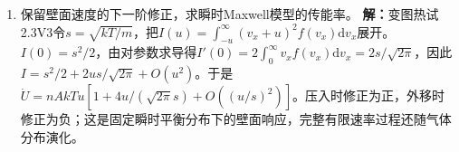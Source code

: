 \documentclass[UTF8,fontset=fandol,a4paper,11pt]{ctexart}
\begin{document}
\begin{enumerate}
\item 保留壁面速度的下一阶修正，求瞬时Maxwell模型的传能率。
\textbf{解：}变图热试2.3V3令$s=\sqrt{kT/m}$，把$I(u)=\int_{-u}^{\infty}(v_x+u)^2f(v_x)\mathrm dv_x$展开。$I(0)=s^2/2$，由对参数求导得$I'(0)=2\int_0^\infty v_xf(v_x)\mathrm dv_x=2s/\sqrt{2\pi}$，因此$I=s^2/2+2us/\sqrt{2\pi}+O(u^2)$。于是$\dot U=nAkTu[1+4u/(\sqrt{2\pi}s)+O((u/s)^2)]$。压入时修正为正，外移时修正为负；这是固定瞬时平衡分布下的壁面响应，完整有限速率过程还随气体分布演化。
\begin{center}\begin{minipage}{.98\linewidth}\centering
{}
\end{minipage}
\end{center}
\end{enumerate}
\end{document}
